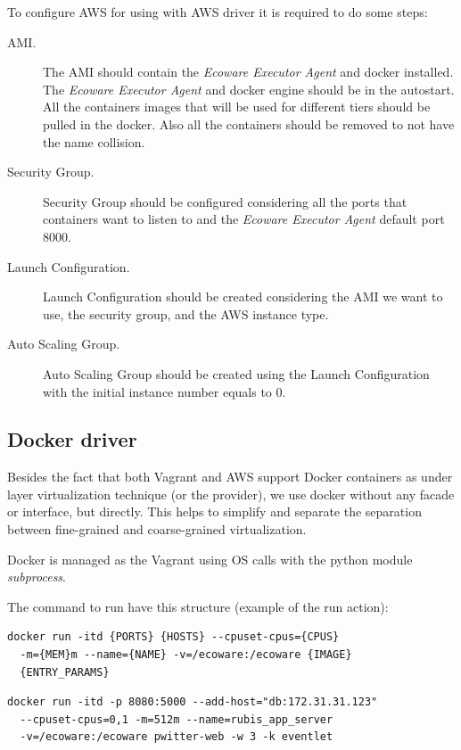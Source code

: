 To configure AWS for using with AWS driver it is required to do some steps:
\begin{description}
    \item [AMI.] The AMI should contain the \textit{Ecoware Executor Agent} and docker installed. The \textit{Ecoware Executor Agent} and docker engine should be in the autostart. All the containers images that will be used for different tiers should be pulled in the docker. Also all the containers should be removed to not have the name collision.
    \item [Security Group.] Security Group should be configured considering all the ports that containers want to listen to and the \textit{Ecoware Executor Agent} default port 8000.
    \item [Launch Configuration.] Launch Configuration should be created considering the AMI we want to use, the security group, and the AWS instance type.
    \item [Auto Scaling Group.] Auto Scaling Group should be created using the Launch Configuration with the initial instance number equals to 0.
\end{description}

\subsection{Docker driver}
Besides the fact that both Vagrant and AWS support Docker containers as under layer virtualization technique (or the provider), we use docker without any facade or interface, but directly. This helps to simplify and separate the separation between fine-grained and coarse-grained virtualization.

Docker is managed as the Vagrant using OS calls with the python module \textit{subprocess}.

\begin{sloppypar}The command to run have this structure (example of the run action):\end{sloppypar}

\begin{lstlisting}[caption=Docker run template,basicstyle=\small]
docker run -itd {PORTS} {HOSTS} --cpuset-cpus={CPUS} 
  -m={MEM}m --name={NAME} -v=/ecoware:/ecoware {IMAGE} 
  {ENTRY_PARAMS}
\end{lstlisting}

\begin{lstlisting}[caption=Docker run example,basicstyle=\small]
docker run -itd -p 8080:5000 --add-host="db:172.31.31.123"
  --cpuset-cpus=0,1 -m=512m --name=rubis_app_server 
  -v=/ecoware:/ecoware pwitter-web -w 3 -k eventlet
\end{lstlisting}

